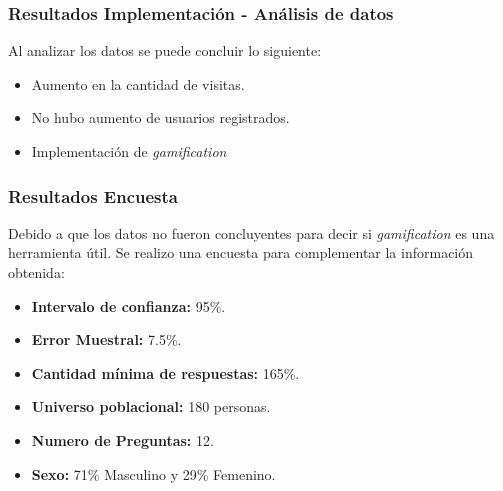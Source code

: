 \documentclass[10pt, compress]{beamer}
\begin{document}
\begin{frame}
 \frametitle{Resultados Implementación - Análisis de datos}

Al analizar los datos se puede concluir lo siguiente:

\begin{itemize}[<+- | alert@+>]
 \item Aumento en la cantidad de visitas.
 \item No hubo aumento de usuarios registrados.
 \item Implementación de \emph{gamification} \color{red}{no fue efectiva.}
\end{itemize}

\begin{table}[h]
\footnotesize
\centering
{}
\caption{Datos Pre y Post implementación.}
\label{tab:tam_empresa}
\end{table}

\end{frame}

\begin{frame}
 \frametitle{Resultados Encuesta}

Debido a que los datos no fueron concluyentes para decir si \emph{gamification} es una herramienta útil. 
Se realizo una encuesta para complementar la información obtenida:

\begin{itemize}
    \item \textbf{Intervalo de confianza:} 95\%.
    \item \textbf{Error Muestral:} 7.5\%.
    \item \textbf{Cantidad mínima de respuestas:} 165\%.
    \item \textbf{Universo poblacional:} 180 personas.
    \item \textbf{Numero de Preguntas:} 12.
    \item \textbf{Sexo:} 71\% Masculino y 29\% Femenino.
\end{itemize}

\end{frame}
\end{document}
